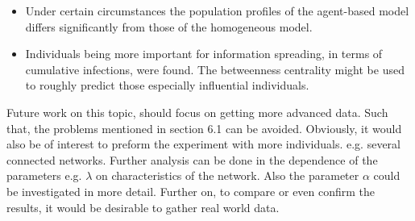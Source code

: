 \begin{itemize}
\item Under certain circumstances the population profiles of the agent-based model differs significantly from those of the homogeneous model.
\item Individuals being more important for information spreading, in terms of cumulative infections, were found. The betweenness centrality might be used to roughly predict those especially influential individuals. 
\end{itemize}

\noindent Future work on this topic, should focus on getting more advanced data. Such that, the problems mentioned in section 6.1 can be avoided. Obviously, it would also be of interest to preform the experiment with more individuals. e.g. several connected networks. Further analysis can be done in the dependence of the parameters e.g. $\lambda$ on characteristics of the network. Also the parameter $\alpha$ could be investigated in more detail. 
Further on, to compare or even confirm the results, it would be desirable to gather real world data.